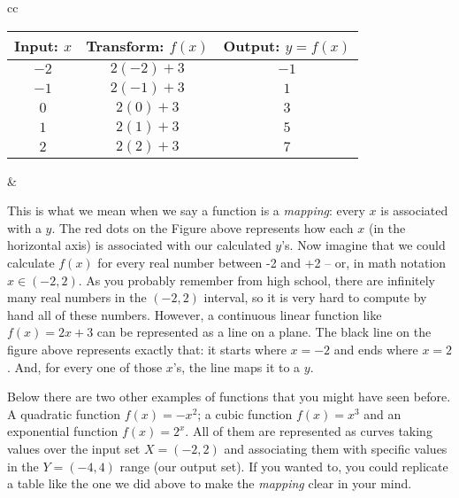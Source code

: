 \documentclass[11pt,letterpaper]{article}
\begin{document}
\begin{center}
\begin{tabular}{cc}
\begin{minipage}{0.45\textwidth}
\centering
\begin{tabular}{|c|c|c|}
\hline
Input: $x$ & Transform: $f(x)$ & Output: $y=f(x)$ \\
\hline
$-2$ & $2(-2)+3$ & $-1$ \\
$-1$ & $2(-1)+3$ & $1$ \\
$0$  & $2(0)+3$  & $3$ \\
$1$  & $2(1)+3$  & $5$ \\
$2$  & $2(2)+3$  & $7$ \\
\hline
\end{tabular}
\end{minipage}
&
\begin{minipage}{0.45\textwidth}
\centering
{}
\end{minipage}
\end{tabular}
\end{center}

This is what we mean when we say a function is a \textit{mapping}: every $x$ is associated with a $y$. The red dots on the Figure above represents how each $x$ (in the horizontal axis) is associated with our calculated $y$'s. Now imagine that we could calculate $f(x)$ for every real number between -2 and +2 -- or, in math notation $x \in (-2,2)$. As you probably remember from high school, there are infinitely many real numbers in the $(-2,2)$ interval, so it is very hard to compute by hand all of these numbers. However, a continuous linear function like $f(x) = 2x + 3$ can be represented as a line on a plane. The black line on the figure above represents exactly that: it starts where $x=-2$ and ends where $x=2$. And, for every one of those $x$'s, the line maps it to a $y$.

Below there are two other examples of functions that you might have seen before. A quadratic function $f(x) = -x^2$; a cubic function $f(x) = x^3$ and an exponential function $f(x) = 2^x$. All of them are represented as curves taking values over the input set $X = (-2,2)$ and associating them with specific values in the $Y=(-4,4)$ range (our output set). If you wanted to, you could replicate a table like the one we did above to make the \textit{mapping} clear in your mind.
\end{document}

